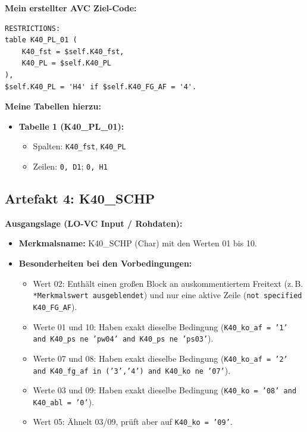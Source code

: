 \documentclass[12pt, a4paper, oneside]{book}
\begin{document}
\textbf{Mein erstellter AVC Ziel-Code:}
\begin{verbatim}
RESTRICTIONS:
table K40_PL_01 (
    K40_fst = $self.K40_fst,
    K40_PL = $self.K40_PL
),
$self.K40_PL = 'H4' if $self.K40_FG_AF = '4'.
\end{verbatim}

\textbf{Meine Tabellen hierzu:}
\begin{itemize}
    \item \textbf{Tabelle 1 (K40\_PL\_01):}
    \begin{itemize}
        \item Spalten: \texttt{K40\_fst}, \texttt{K40\_PL}
        \item Zeilen: \texttt{0, D1}; \texttt{0, H1}
    \end{itemize}
\end{itemize}

\vspace{1em}

\subsection*{Artefakt 4: K40\_SCHP}

\textbf{Ausgangslage (LO-VC Input / Rohdaten):}
\begin{itemize}
    \item \textbf{Merkmalsname:} K40\_SCHP (Char) mit den Werten 01 bis 10.
    \item \textbf{Besonderheiten bei den Vorbedingungen:}
    \begin{itemize}
        \item Wert 02: Enthält einen großen Block an auskommentiertem Freitext (z.\,B. \texttt{*Merkmalswert ausgeblendet}) und nur eine aktive Zeile (\texttt{not specified K40\_FG\_AF}).
        \item Werte 01 und 10: Haben exakt dieselbe Bedingung (\texttt{K40\_ko\_af = '1' and K40\_ps ne 'pw04' and K40\_ps ne 'ps03'}).
        \item Werte 07 und 08: Haben exakt dieselbe Bedingung (\texttt{K40\_ko\_af = '2' and K40\_fg\_af in ('3','4') and K40\_ko ne '07'}).
        \item Werte 03 und 09: Haben exakt dieselbe Bedingung (\texttt{K40\_ko = '08' and K40\_abl = '0'}).
        \item Wert 05: Ähnelt 03/09, prüft aber auf \texttt{K40\_ko = '09'}.
    \end{itemize}
\end{itemize}
\end{document}
